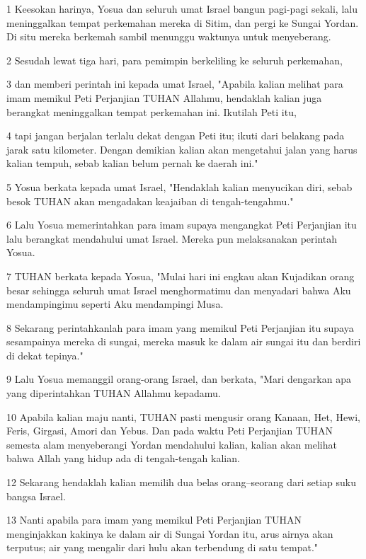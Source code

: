 \par 1 Keesokan harinya, Yosua dan seluruh umat Israel bangun pagi-pagi sekali, lalu meninggalkan tempat perkemahan mereka di Sitim, dan pergi ke Sungai Yordan. Di situ mereka berkemah sambil menunggu waktunya untuk menyeberang.
\par 2 Sesudah lewat tiga hari, para pemimpin berkeliling ke seluruh perkemahan,
\par 3 dan memberi perintah ini kepada umat Israel, "Apabila kalian melihat para imam memikul Peti Perjanjian TUHAN Allahmu, hendaklah kalian juga berangkat meninggalkan tempat perkemahan ini. Ikutilah Peti itu,
\par 4 tapi jangan berjalan terlalu dekat dengan Peti itu; ikuti dari belakang pada jarak satu kilometer. Dengan demikian kalian akan mengetahui jalan yang harus kalian tempuh, sebab kalian belum pernah ke daerah ini."
\par 5 Yosua berkata kepada umat Israel, "Hendaklah kalian menyucikan diri, sebab besok TUHAN akan mengadakan keajaiban di tengah-tengahmu."
\par 6 Lalu Yosua memerintahkan para imam supaya mengangkat Peti Perjanjian itu lalu berangkat mendahului umat Israel. Mereka pun melaksanakan perintah Yosua.
\par 7 TUHAN berkata kepada Yosua, "Mulai hari ini engkau akan Kujadikan orang besar sehingga seluruh umat Israel menghormatimu dan menyadari bahwa Aku mendampingimu seperti Aku mendampingi Musa.
\par 8 Sekarang perintahkanlah para imam yang memikul Peti Perjanjian itu supaya sesampainya mereka di sungai, mereka masuk ke dalam air sungai itu dan berdiri di dekat tepinya."
\par 9 Lalu Yosua memanggil orang-orang Israel, dan berkata, "Mari dengarkan apa yang diperintahkan TUHAN Allahmu kepadamu.
\par 10 Apabila kalian maju nanti, TUHAN pasti mengusir orang Kanaan, Het, Hewi, Feris, Girgasi, Amori dan Yebus. Dan pada waktu Peti Perjanjian TUHAN semesta alam menyeberangi Yordan mendahului kalian, kalian akan melihat bahwa Allah yang hidup ada di tengah-tengah kalian.
\par 12 Sekarang hendaklah kalian memilih dua belas orang--seorang dari setiap suku bangsa Israel.
\par 13 Nanti apabila para imam yang memikul Peti Perjanjian TUHAN menginjakkan kakinya ke dalam air di Sungai Yordan itu, arus airnya akan terputus; air yang mengalir dari hulu akan terbendung di satu tempat."
